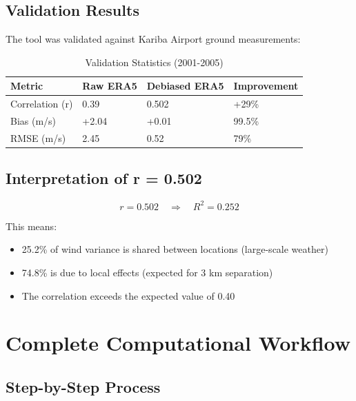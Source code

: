 \documentclass[12pt]{article}
\begin{document}
\subsection{Validation Results}

The tool was validated against Kariba Airport ground measurements:

\begin{table}[H]
\centering
\caption{Validation Statistics (2001-2005)}
\begin{tabular}{|l|l|l|l|}
\hline
\textbf{Metric} & \textbf{Raw ERA5} & \textbf{Debiased ERA5} & \textbf{Improvement} \\
\hline
Correlation (r) & 0.39 & 0.502 & +29\% \\
Bias (m/s) & +2.04 & +0.01 & 99.5\% \\
RMSE (m/s) & 2.45 & 0.52 & 79\% \\
\hline
\end{tabular}
\end{table}

\subsection{Interpretation of r = 0.502}

\begin{equation}
r = 0.502 \quad \Rightarrow \quad R^2 = 0.252
\end{equation}

This means:
\begin{itemize}
    \item 25.2\% of wind variance is shared between locations (large-scale weather)
    \item 74.8\% is due to local effects (expected for 3 km separation)
    \item The correlation exceeds the expected value of 0.40
\end{itemize}

\newpage

\section{Complete Computational Workflow}

\subsection{Step-by-Step Process}
\end{document}
